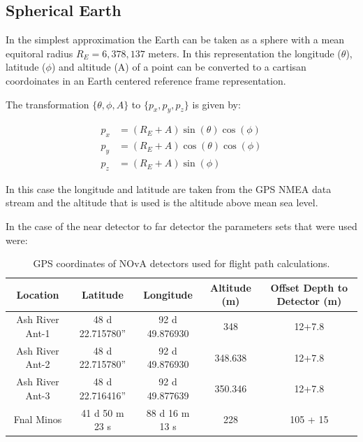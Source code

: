 \subsection{Spherical Earth}

In the simplest approximation the Earth can be taken as a sphere with
a mean equitoral radius $R_E = 6,378,137$ meters.  In this representation
the longitude ($\theta$), latitude ($\phi$) and altitude (A) of a point can be converted to a
cartisan coordoinates in an Earth centered reference frame
representation.

The transformation $\{\theta, \phi, A\}$ to $\{p_x,p_y,p_z\}$ is given by:

\begin{align}
p_x &= ( R_E + A ) \sin(\theta)\cos(\phi) \\ 
p_y &= (R_E + A) \cos(\theta)\cos(\phi) \\
 p_z &= (R_E + A) \sin(\phi)
\end{align} 

In this case the longitude and latitude are taken from the GPS NMEA
data stream and the altitude that is used is the altitude above mean
sea level.

In the case of the near detector to far detector the parameters sets that were used
were:

\begin{table}
\begin{center}
\begin{tabular}{| c | c | c | c| c| }
\hline
Location & Latitude & Longitude & Altitude (m) & Offset Depth to Detector (m)\\
\hline
Ash River Ant-1 & 48 d 22.715780'' & 92 d 49.876930 & 348         & 12+7.8 \\  
Ash River Ant-2 & 48 d 22.715780'' & 92 d 49.876930 & 348.638  & 12+7.8 \\  
Ash River Ant-3 & 48 d 22.716416'' & 92 d 49.877639 & 350.346  & 12+7.8 \\  
\hline
Fnal Minos         &  41 d 50 m 23 s   & 88 d 16 m 13 s  & 228
& 105 + 15 \\
\hline
\end{tabular}
\caption[GPS Detector Locations]{\label{table:gps_det_loc} GPS
  coordinates of NOvA detectors used for flight path calculations.}
\end{center}
\end{table}

